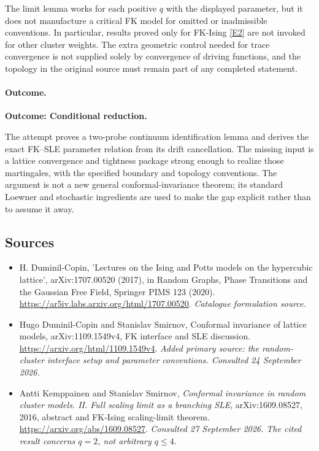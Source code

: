 \documentclass[11pt,a4paper]{article}
\newcommand{\eref}[2]{\hyperlink{extra:#1:#2}{[E#2]}}
\numberwithin{equation}{section}
\begin{document}
The limit lemma works for each positive $q$ with the displayed parameter,
but it does not manufacture a critical FK model for omitted or inadmissible
conventions. In particular, results proved only for FK-Ising
\eref{30006768}{2} are not invoked for other cluster weights. The extra geometric
control needed for trace convergence is not supplied solely by convergence
of driving functions, and the topology in the original source must remain
part of any completed statement.

\paragraph{Outcome.}
\textbf{Outcome: Conditional reduction.}

The attempt proves a two-probe continuum identification lemma and derives
the exact FK--SLE parameter relation from its drift cancellation. The
missing input is a lattice convergence and tightness package strong enough
to realize those martingales, with the specified boundary and topology
conventions. The argument is not a new general conformal-invariance theorem;
its standard Loewner and stochastic ingredients are used to make the gap
explicit rather than to assume it away.
\subsection{Sources}
\begin{itemize}\raggedright
\item[\textnormal{[S1]}]\hypertarget{source:30006768:1}{} H. Duminil-Copin, 'Lectures on the Ising and Potts models on the hypercubic lattice', arXiv:1707.00520 (2017), in Random Graphs, Phase Transitions and the Gaussian Free Field, Springer PIMS 123 (2020).
\url{https://ar5iv.labs.arxiv.org/html/1707.00520}.
{\small\textit{Catalogue formulation source.}}
\item[\textnormal{[E1]}]\hypertarget{extra:30006768:1}{} Hugo Duminil-Copin and Stanislav Smirnov, Conformal invariance of lattice models, arXiv:1109.1549v4, FK interface and SLE discussion.
\url{https://arxiv.org/html/1109.1549v4}.
{\small\textit{Added primary source: the random-cluster interface setup and parameter conventions. Consulted 24 September 2026.}}
\item[\textnormal{[E2]}]\hypertarget{extra:30006768:2}{} Antti Kemppainen and
Stanislav Smirnov, \emph{Conformal invariance in random cluster models.
II. Full scaling limit as a branching SLE}, arXiv:1609.08527, 2016,
abstract and FK-Ising scaling-limit theorem.
\url{https://arxiv.org/abs/1609.08527}.
{\small\textit{Consulted 27 September 2026. The cited result concerns
$q=2$, not arbitrary $q\le4$.}}
\end{itemize}
\end{document}
